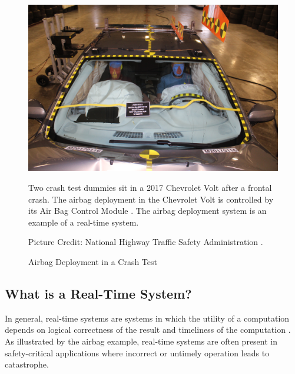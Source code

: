 \begin{figure}
    \centering
    \includegraphics[width=0.75\linewidth]{fig/chevyVoltPostCrashTestDummies.jpg}
    \caption{Airbag Deployment in a Crash Test} Two crash test dummies sit in a 2017 Chevrolet Volt after a frontal crash.
    The airbag deployment in the Chevrolet Volt is controlled by its Air Bag Control Module \cite{gmpartsdirectcom_2014-2018_nodate}.
    The airbag deployment system is an example of a real-time system.

    Picture Credit: National Highway Traffic Safety Administration \cite{national_highway_traffic_safety_administration_nhtsa_nodate}.
    \label{fig:crashDummies}
\end{figure}

\subsection{What is a Real-Time System?}

In general, real-time systems are systems in which the utility of a computation depends on logical correctness of the result and timeliness of the computation \cite{buttazzo_hard_1997}.
As illustrated by the airbag example, real-time systems are often present in safety-critical applications where incorrect or untimely operation leads to catastrophe.

